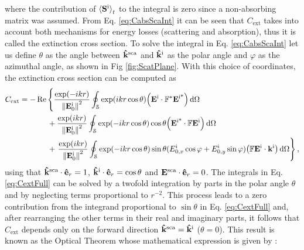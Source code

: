 %
where the contribution of $\ev{\vb{S}^\text{i}}_t$ to the integral is zero since a non-absorbing matrix was assumed. From Eq. \eqref{eq:CabsScaInt} it can be seen that $C_\text{ext}$ takes into account both mechanisms for energy losses (scattering and absorption), thus it is called the extinction cross section. To solve the integral in Eq. \eqref{eq:CabsScaInt} let us define $\theta$ as the angle between $\vu{k}^\text{sca}$ and $\vu{k}^\text{i}$ as the polar angle  and  $\varphi$ as the azimuthal angle, as shown in Fig \ref{fig:ScatPlane}. With this choice of coordinates,  the extinction cross section can be computed as
%
%
\begin{align}
C_\text{ext} = - &\Re \left\{
			 \frac{\exp(-ikr) }{\norm{\vb{E}_0^\text{i}}^2}
			 			\oint_\mathcal{S} \exp(ikr\cos\theta)\qty(\vb{E}^\text{i}\cdot \mathbb{F}^*\vb{E}^\text{i*})  \dd{\Omega} \right.	\notag\\
			&\hspace*{1.5em}+\frac{\exp(ikr) }{\norm{\vb{E}_0^\text{i}}^2}
						\oint_\mathcal{S} \exp(-ikr\cos\theta)\cos\theta \qty(\vb{E}^\text{i*}\cdot \mathbb{F}\vb{E}^\text{i})     \dd{\Omega}
\label{eq:CextFull}\\
			&\hspace*{1.5em}+\left.\frac{\exp(ikr) }{\norm{\vb{E}^\text{i}_0}^2}
						\oint_\mathcal{S} \exp(-ikr\cos\theta)\sin\theta(E_{0,x}^\text{i}\cos\varphi+E_{0,y}^\text{i}\sin\varphi)
									\qty(\mathbb{F}\vb{E}^\text{i}\cdot\vb{k}^\text{i})    \dd{\Omega}  \right\}, \notag
\end{align}
%
using that $\vu{k}^\text{sca}\cdot\vu{e}_r = 1$, $\vu{k}^\text{i}\cdot\vu{e}_r = \cos\theta$ and  $\vb{E}^\text{sca}\cdot\vu{e}_r = 0$. The integrals in Eq. \eqref{eq:CextFull} can be solved by a twofold integration by parts in the polar angle $\theta$ and by neglecting terms proportional to $r^{-2}$. This process leads to a zero contribution from the integrand proportional to $\sin\theta$  in Eq. \eqref{eq:CextFull} and, after rearranging the other terms in their real and imaginary parts, it follows that $C_\text{ext}$ depends only on the forward direction  $\vu{k}^\text{sca} = \vu{k}^\text{i}$ ($\theta =0$). This result is known as the Optical Theorem  whose mathematical expression is given by \cite{tsang_scattering_2000,pellarin_forward_2019,newton_optical_1976}:
